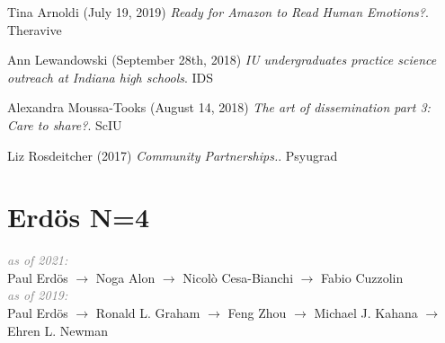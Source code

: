 \documentclass[10pt]{cooperCV2}
\begin{document}
\begin{etaremune}[itemindent=-\bibhang, topsep=0pt,
				   itemsep=\bibsep,partopsep=0pt,parsep=0pt,leftmargin={\bibhang+\widthof{[999]}}]
	
    \item Tina Arnoldi (July 19, 2019) \textit{Ready for Amazon to Read Human Emotions?}. Theravive
     
	
    \item Ann Lewandowski (September 28th, 2018) \textit{IU undergraduates practice science outreach at Indiana high schools}. IDS
     
	
    \item Alexandra Moussa-Tooks (August 14, 2018) \textit{The art of dissemination part 3: Care to share?}. ScIU
     
	
    \item Liz Rosdeitcher (2017) \textit{Community Partnerships.}. Psyugrad
     
	


\end{etaremune}




























\section{Erdös N=4}

\textit{\textcolor{grey}{as of 2021:}}\\
Paul Erdös $\rightarrow$ Noga Alon $\rightarrow$ Nicolò Cesa-Bianchi $\rightarrow$ Fabio Cuzzolin\\

\textit{\textcolor{grey}{as of 2019:}}\\
Paul Erdös $\rightarrow$ Ronald L. Graham $\rightarrow$ Feng Zhou $\rightarrow$ Michael J. Kahana $\rightarrow$ Ehren L. Newman\\
\end{document}
